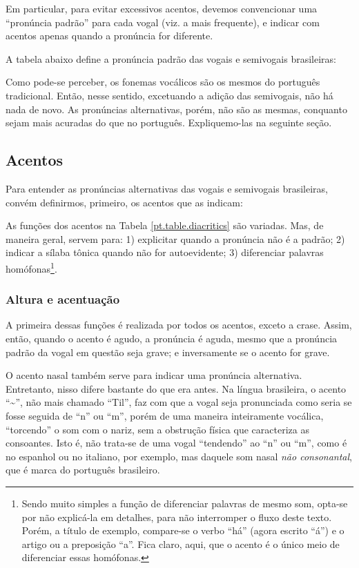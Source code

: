 \documentclass[12pt, a5paper, titlepage]{article}
\begin{document}
\begin{bilingualpages}
    Em particular, para evitar excessivos acentos, devemos convencionar uma
    ``pronúncia padrão'' para cada vogal (viz. a mais frequente), e indicar com
    acentos apenas quando a pronúncia for diferente.

    A tabela abaixo define a pronúncia padrão das vogais e semivogais brasileiras:

    \PtTableVowels

    Como pode-se perceber, os fonemas vocálicos são os mesmos do português
    tradicional. Então, nesse sentido, excetuando a adição das semivogais, não há
    nada de novo. As pronúncias alternativas, porém, não são as mesmas, conquanto
    sejam mais acuradas do que no português. Expliquemo-las na seguinte seção.

    \subsection{Acentos}
    Para entender as pronúncias alternativas das vogais e semivogais brasileiras,
    convém definirmos, primeiro, os acentos que as indicam:

    \PtTableDiacritics

    As funções dos acentos na Tabela \ref{pt.table.diacritics} são variadas. Mas,
    de maneira geral, servem para: 1) explicitar quando a pronúncia não é a padrão;
    2) indicar a sílaba tônica quando não for autoevidente; 3) diferenciar palavras
    homófonas\footnote{Sendo muito simples a função de diferenciar palavras de mesmo som, opta-se por não explicá-la em detalhes, para não interromper o fluxo deste texto. Porém, a título de exemplo, compare-se o verbo ``há'' (agora escrito ``á'') e o artigo ou a preposição ``a''. Fica claro, aqui, que o acento é o único meio de diferenciar essas homófonas.}.

    \subsubsection{Altura e acentuação}
    A primeira dessas funções é realizada por todos os acentos, exceto a crase.
    Assim, então, quando o acento é agudo, a pronúncia é aguda, mesmo que a
    pronúncia padrão da vogal em questão seja grave; e inversamente se o acento for
    grave.

    O acento nasal também serve para indicar uma pronúncia alternativa. Entretanto,
    nisso difere bastante do que era antes. Na língua brasileira, o acento
    ``\textasciitilde'', não mais chamado ``Til'', faz com que a vogal seja
    pronunciada como seria se fosse seguida de ``n'' ou ``m'', porém de uma maneira
    inteiramente vocálica, ``torcendo'' o som com o nariz, sem a obstrução física
    que caracteriza as consoantes. Isto é, não trata-se de uma vogal ``tendendo''
    ao ``n'' ou ``m'', como é no espanhol ou no italiano, por exemplo, mas daquele
    som nasal \textit{não consonantal}, que é marca do português brasileiro.


\end{bilingualpages}
\end{document}
